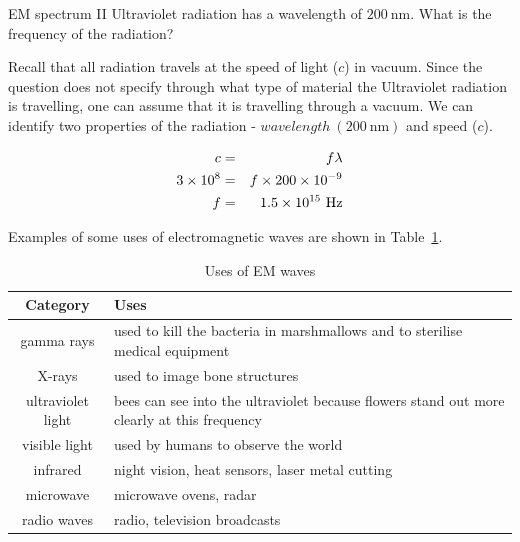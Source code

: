 \begin{wex}{EM spectrum II}
{Ultraviolet radiation has a wavelength of $200~\mathrm{nm}$. What is the frequency of the radiation?}
{
Recall that all radiation travels at the speed of light ($c$) in vacuum.
Since the question does not specify through what type of material the Ultraviolet radiation
is travelling, one can assume that it is travelling through a vacuum.
We can identify two properties of the radiation - $wavelength
~(200~\mathrm{nm})$ and speed ($c$).

\begin{eqnarray*}
c &=& f \lambda \\
3 \times 10^{8} &=& f \times 200 \times 10^{-9} \\
f &=&  1.5 \times 10^{15} \ \rm{Hz}
\end{eqnarray*}
}
\end{wex}

Examples of some uses of electromagnetic waves are shown in Table~\ref{tab:emuses}. 

\begin{table}[htbp]
\begin{center}
\caption{Uses of EM waves}
\label{tab:emuses}
\begin{tabular}{|c|p{5cm}|}\hline
\textbf{Category}&\textbf{Uses}\\\hline\hline
gamma rays&used to kill the bacteria in marshmallows and to sterilise medical equipment\\\hline
X-rays&used to image bone structures\\\hline
ultraviolet light&bees can see into the ultraviolet because flowers stand out more clearly at this frequency\\\hline
visible light&used by humans to observe the world\\\hline
infrared&night vision, heat sensors, laser metal cutting\\\hline
microwave&microwave ovens, radar\\\hline
radio waves&radio, television broadcasts\\\hline
\end{tabular}
\end{center}
\end{table}

